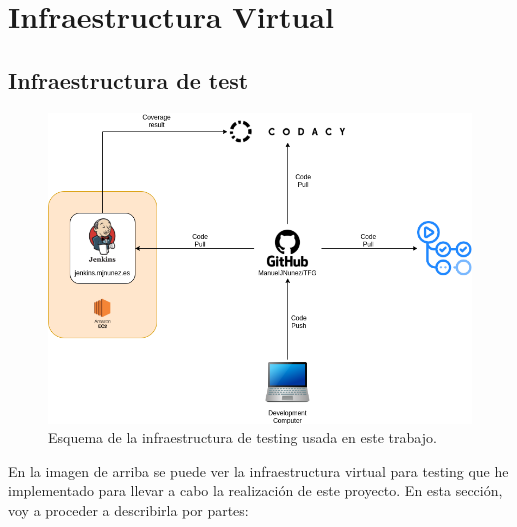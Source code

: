 \section{Infraestructura Virtual}

\subsection{Infraestructura de test}

\begin{figure}[H]
	\includegraphics[width=1.\linewidth]{imagenes/05_Implementacion/testinfra.png}
	\centering
	\caption{Esquema de la infraestructura de testing usada en este trabajo.}
\end{figure}

En la imagen de arriba se puede ver la infraestructura virtual para testing que he implementado para llevar a cabo la realización de este proyecto. En esta sección, voy a proceder a describirla por partes:\newline

